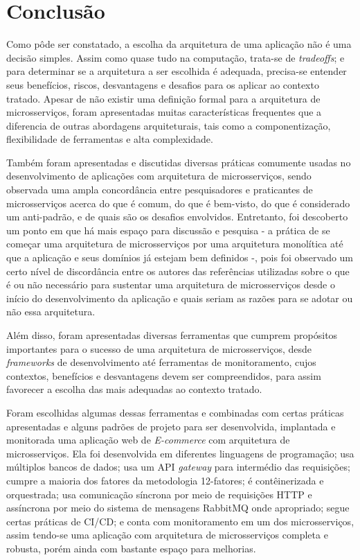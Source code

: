 \chapter{Conclusão}\label{chapter-conclusao}
Como pôde ser constatado, a escolha da arquitetura de uma aplicação não é uma decisão simples. Assim como quase tudo na computação, trata-se de \emph{tradeoffs}; e para determinar se a arquitetura a ser escolhida é adequada, precisa-se entender seus benefícios, riscos, desvantagens e desafios para os aplicar ao contexto tratado. Apesar de não existir uma definição formal para a arquitetura de microsserviços, foram apresentadas muitas características frequentes que a diferencia de outras abordagens arquiteturais, tais como a componentização, flexibilidade de ferramentas e alta complexidade.

Também foram apresentadas e discutidas diversas práticas comumente usadas no desenvolvimento de aplicações com arquitetura de microsserviços, sendo observada uma ampla concordância entre pesquisadores e praticantes de microsserviços acerca do que é comum, do que é bem-visto, do que é considerado um anti-padrão, e de quais são os desafios envolvidos. Entretanto, foi descoberto um ponto em que há mais espaço para discussão e pesquisa - a prática de se começar uma arquitetura de microsserviços por uma arquitetura monolítica até que a aplicação e seus domínios já estejam bem definidos -, pois foi observado um certo nível de discordância entre os autores das referências utilizadas sobre o que é ou não necessário para sustentar uma arquitetura de microsserviços desde o início do desenvolvimento da aplicação e quais seriam as razões para se adotar ou não essa arquitetura.

Além disso, foram apresentadas diversas ferramentas que cumprem propósitos importantes para o sucesso de uma arquitetura de microsserviços, desde \emph{frameworks} de desenvolvimento até ferramentas de monitoramento, cujos contextos, benefícios e desvantagens devem ser compreendidos, para assim favorecer a escolha das mais adequadas ao contexto tratado. 

Foram escolhidas algumas dessas ferramentas e combinadas com certas práticas apresentadas e alguns padrões de projeto para ser desenvolvida, implantada e monitorada uma aplicação web de \emph{E-commerce} com arquitetura de microsserviços. Ela foi desenvolvida em diferentes linguagens de programação; usa múltiplos bancos de dados; usa um API \emph{gateway} para intermédio das requisições; cumpre a maioria dos fatores da metodologia 12-fatores; é contêinerizada e orquestrada; usa comunicação síncrona por meio de requisições HTTP e assíncrona por meio do sistema de mensagens RabbitMQ onde apropriado; segue certas práticas de CI/CD; e conta com monitoramento em um dos microsserviços, assim tendo-se uma aplicação com arquitetura de microsserviços completa e robusta, porém ainda com bastante espaço para melhorias.

